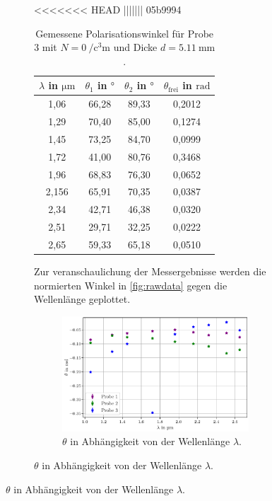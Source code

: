 \begin{figure}[H]
\begin{figure}
<<<<<<< HEAD
||||||| 05b9994
\begin{table}[H]
    \centering
    \caption{Gemessene Polarisationswinkel für Probe 3 mit $N = \qty{0}{\per\cubic\centi\meter}$ und Dicke $d = \qty{5.11}{\milli\meter}$.}
    \label{tab:probe3}
    \begin{tabular}{c c c c}
        \toprule
        {$\lambda$ in $\si{\micro\meter}$} & {$\theta_1$ in $\si{\degree}$} & {$\theta_2$ in $\si{\degree}$} & {$\theta_\text{frei}$ in $\si{\radian}$} \\
        \midrule
        1,06  & 66,28 & 89,33 & 0,2012 \\
        1,29  & 70,40 & 85,00 & 0,1274 \\
        1,45  & 73,25 & 84,70 & 0,0999 \\
        1,72  & 41,00 & 80,76 & 0,3468 \\
        1,96  & 68,83 & 76,30 & 0,0652 \\
        2,156 & 65,91 & 70,35 & 0,0387  \\
        2,34  & 42,71 & 46,38 & 0,0320 \\
        2,51  & 29,71 & 32,25 & 0,0222 \\
        2,65  & 59,33 & 65,18 & 0,0510 \\   
        \bottomrule
    \end{tabular}
\end{table}
Zur veranschaulichung der Messergebnisse werden die normierten Winkel in \autoref{fig:rawdata} gegen die Wellenlänge geplottet.
\begin{figure}
    \centering
    \includegraphics[width=\textwidth]{plots/raw_data.pdf}
    \caption{$\theta$ in Abhängigkeit von der Wellenlänge $\lambda$.}
    \label{fig:rawdata}
\end{figure}


\end{figure}
\end{figure}
